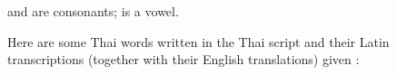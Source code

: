 \begin{refsection}
\begin{problem}{\langnameJavanese}{\nameTHLee}{}
\begin{assgts}
\item \fillblanks
\end{assgts}
\begin{tblsWarning} 
 and  are consonants;  is a vowel.
\end{tblsWarning}
\end{problem}

\begin{problem}{\langnameThai}{\nameSDmitrenko}{}
Here are some Thai words written in the Thai script and their Latin transcriptions (together with their English translations) given \OlympiadRandomOrder{}:
\begin{enumerate}

    \begin{multicols}{5}
        \item {}
        \item {}
        \item {}
        \item {}
        \item {}
        \item {}
        \item {}
        \item {}
        \item {}
        \item {}
        \item {}
        \item {}
        \item {}
        \item {}
        \item[] \quad 
    \end{multicols}
\end{enumerate}


\end{problem}
\end{refsection}
